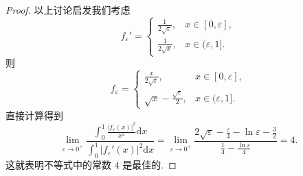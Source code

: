 \documentclass[../../main.tex]{subfiles}%
\begin{document}
\begin{proof}
以上讨论启发我们考虑
$$f_\varepsilon' = \begin{cases} 
\frac{1}{2\sqrt{\varepsilon}}, & x \in [0, \varepsilon], \\
\frac{1}{2\sqrt{x}}, & x \in (\varepsilon, 1].
\end{cases}$$
则
$$f_\varepsilon = \begin{cases} 
\frac{x}{2\sqrt{\varepsilon}}, & x \in [0, \varepsilon], \\
\sqrt{x} - \frac{\sqrt{\varepsilon}}{2}, & x \in (\varepsilon, 1].
\end{cases}$$
直接计算得到
$$\lim_{\varepsilon \to 0^+} \frac{\int_0^1 \frac{|f_\varepsilon(x)|^2}{x^2} \mathrm{d}x}{\int_0^1 |f_\varepsilon'(x)|^2 \mathrm{d}x} = \lim_{\varepsilon \to 0^+} \frac{2\sqrt{\varepsilon} - \frac{\varepsilon}{4} - \ln \varepsilon - \frac{3}{2}}{\frac{1}{4} - \frac{\ln \varepsilon}{4}} = 4.$$
这就表明不等式中的常数 $4$ 是最佳的.
\end{proof}
\end{document}
